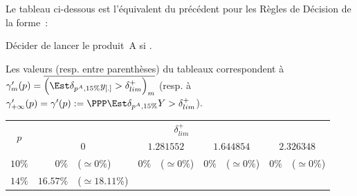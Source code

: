\documentclass[10pt]{report}
\begin{document}
\begin{exercice}
\begin{center}
\begin{tabular}{|c|rl|rl|rl|rl|}
    \end{tabular}

\end{center}

\noindent Le tableau ci-dessous est l'équivalent du précédent pour les Règles de Décision de la forme~:
\begin{center}
Décider de lancer le produit~A si .
\end{center} 
Les valeurs (resp. entre parenthèses) du tableaux correspondent à $\gamma^\prime_m(p)=\overline{\Big(\Est{\delta_{p^A,15\%}}{y_{[.]}}>\delta^+_{lim}\Big)_m}$ (resp. à $\gamma^\prime_{+\infty}(p)=\gamma^\prime(p):=\PPP{\Est{\delta_{p^A,15\%}}{Y}>\delta^+_{lim}}$).
\begin{center}
\begin{tabular}{|c|rl|rl|rl|rl|}\cline{1-9}
        \multirow{2}{*}{$p$}
         & 
    \multicolumn{8}{c|}{$\delta^+_{lim}$}
    
    
    
    
    
    
    
    \\ \cline{2-9}

    
        
         & 
    \multicolumn{2}{c|}{$0$}
     & 
    \multicolumn{2}{c|}{$1.281552$}
     & 
    \multicolumn{2}{c|}{$1.644854$}
     & 
    \multicolumn{2}{c|}{$2.326348$}
    
    \\ \cline{1-9}

    
        $10\%$
         & 
    
        $0\%$
         & 
    
        ($\simeq0\%$)
         & 
    
        $0\%$
         & 
    
        ($\simeq0\%$)
         & 
    
        $0\%$
         & 
    
        ($\simeq0\%$)
         & 
    
        $0\%$
         & 
    
        ($\simeq0\%$)
        
    \\ 

    
        $14\%$
         & 
    
        $16.57\%$
         & 
    
        ($\simeq18.11\%$)
         & 
    

\end{tabular}
\end{center}
\end{exercice}
\end{document}
